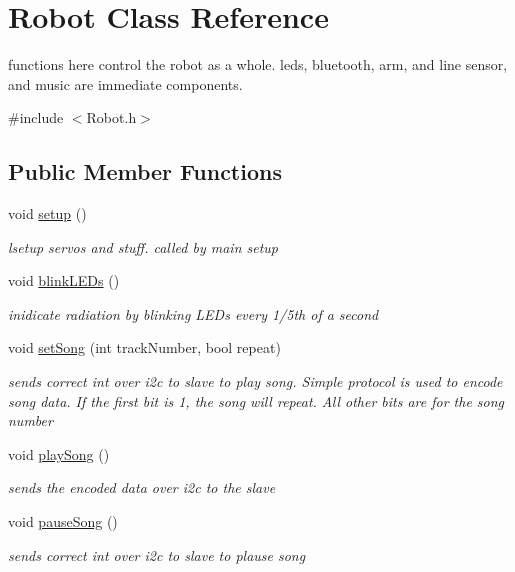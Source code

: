 \hypertarget{classRobot}{\section{Robot Class Reference}
\label{classRobot}
}


functions here control the robot as a whole. leds, bluetooth, arm, and line sensor, and music are immediate components.  




{\ttfamily \#include $<$Robot.\-h$>$}

\subsection*{Public Member Functions}
\begin{DoxyCompactItemize}
\item 
void \hyperlink{classRobot_a1fc37e3c329d59795f6adf44199d4df9}{setup} ()
\begin{DoxyCompactList}\small\item\em lsetup servos and stuff. called by main setup \end{DoxyCompactList}\item 
void \hyperlink{classRobot_a4215f7e880311c2118f387df75effaf2}{blink\-L\-E\-Ds} ()
\begin{DoxyCompactList}\small\item\em inidicate radiation by blinking L\-E\-Ds every 1/5th of a second \end{DoxyCompactList}\item 
void \hyperlink{classRobot_a87e94e8db5092976d1125c674cf2b519}{set\-Song} (int track\-Number, bool repeat)
\begin{DoxyCompactList}\small\item\em sends correct int over i2c to slave to play song. Simple protocol is used to encode song data. If the first bit is 1, the song will repeat. All other bits are for the song number \end{DoxyCompactList}\item 
void \hyperlink{classRobot_ad86dbbb2ad0d065f3e4c30fd4b742e1c}{play\-Song} ()
\begin{DoxyCompactList}\small\item\em sends the encoded data over i2c to the slave \end{DoxyCompactList}\item 
void \hyperlink{classRobot_a7c4cf197187f9f7dcb883ebc58f52b93}{pause\-Song} ()
\begin{DoxyCompactList}\small\item\em sends correct int over i2c to slave to plause song \end{DoxyCompactList}\item 

\end{DoxyCompactItemize}
